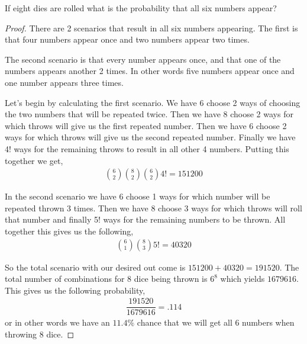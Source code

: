 \documentclass[11pt]{article}
\newenvironment{problem}[2][Problem\!]{\begin{trivlist}
\item[\hskip \labelsep {\bfseries #1}\hskip \labelsep {\bfseries #2}]}{\end{trivlist}}
\begin{document}
\begin{tcolorbox}
    \begin{problem} {IC | 11/03 | 122.}
        If eight dies are rolled what is the probability that all six numbers appear?
    \end{problem}
\end{tcolorbox}
\begin{proof}
    There are 2 scenarios that result in all six numbers appearing. The first is that four numbers appear once and two numbers appear two times. 

    The second scenario is that every number appears once, and that one of the numbers appears another 2 times. In other words five numbers appear once and one number appears three times. 

    Let's begin by calculating the first scenario. We have 6 choose 2 ways of choosing the two numbers that will be repeated twice. Then we have 8 choose 2 ways for which throws will give us the first repeated number. Then we have 6 choose 2 ways for which throws will give us the second repeated number. Finally we have 4! ways for the remaining throws to result in all other 4 numbers. Putting this together we get,
    \begin{align*}
        \binom{6}{2}\binom{8}{2}\binom{6}{2}4! = 151200 
    \end{align*}

    In the second scenario we have 6 choose 1 ways for which number will be repeated thrown 3 times. Then we have 8 choose 3 ways for which throws will roll that number and finally 5! ways for the remaining numbers to be thrown. All together this gives us the following,
    \begin{align*}
        \binom{6}{1} \binom{8}{3} 5! = 40320
    \end{align*}

    So the total scenario with our desired out come is $151200 + 40320 = 191520$. The total number of combinations for 8 dice being thrown is $6^8$ which yields $1679616$. This gives us the following probability,
    \begin{align*}
        \dfrac{191520}{1679616} = .114
    \end{align*}
    or in other words we have an $11.4\%$ chance that we will get all 6 numbers when throwing 8 dice. 
\end{proof}
\end{document}
